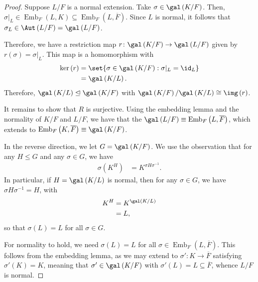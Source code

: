\documentclass[10pt]{mypackage}
\begin{document}
\begin{proof}
  Suppose $L/F$ is a normal extension. Take $\sigma\in \gal\left( K/F \right)$. Then, $\sigma|_{L}\in \operatorname{Emb}_F\left( L,K \right)\subseteq \operatorname{Emb}_{F}\left( L, \overline{F} \right)$. Since $L$ is normal, it follows that $\sigma_L\in \Aut\left( L/F \right) = \gal\left( L/F \right)$.

  Therefore, we have a restriction map $r\colon \gal\left( K/F \right)\rightarrow \gal\left( L/F \right)$ given by $r\left( \sigma \right) = \sigma|_{L}$. This map is a homomorphism with
  \begin{align*}
    \ker\left( r \right) &= \set{\sigma\in \gal\left( K/F \right) : \sigma\vert_{L} = \id_L}\\
                         &= \gal\left( K/L \right).
  \end{align*}
  Therefore, $\gal\left( K/L \right)\trianglelefteq \gal\left( K/F \right)$ with $\gal\left( K/F \right)/\gal\left( K/L \right)\cong \img\left( r \right)$.

  It remains to show that $R$ is surjective. Using the embedding lemma and the normality of $K/F$ and $L/F$, we have that the $\gal\left( L/F \right)\equiv \operatorname{Emb}_F\left( L, \overline{F} \right)$, which extends to $ \operatorname{Emb}_F\left( K, \overline{F} \right)\equiv \gal\left( K/F \right) $.

  In the reverse direction, we let $G = \gal\left( K/F \right)$. We use the observation that for any $H\leq G$ and any $\sigma\in G$, we have
  \begin{align*}
    \sigma\left( K^{H} \right) &= K^{\sigma H \sigma^{-1}}.
  \end{align*}
  In particular, if $H = \gal\left( K/L \right)$ is normal, then for any $\sigma\in G$, we have $\sigma H \sigma^{-1} = H$, with
  \begin{align*}
    K^{H} &= K^{\gal\left( K/L \right)}\\
          &= L,
  \end{align*}
  so that $\sigma(L) = L$ for all $\sigma\in G$.

  For normality to hold, we need $\sigma(L) = L$ for all $\sigma\in \operatorname{Emb}_F\left( L, \overline{F} \right)$. This follows from the embedding lemma, as we may extend to $\sigma'\colon K\rightarrow \overline{F}$ satisfying $\sigma'(K) = K$, meaning that $\sigma'\in \gal\left( K/F \right)$ with $\sigma'\left( L \right) = L\subseteq \overline{F}$, whence $L/F$ is normal.
\end{proof}
\end{document}
